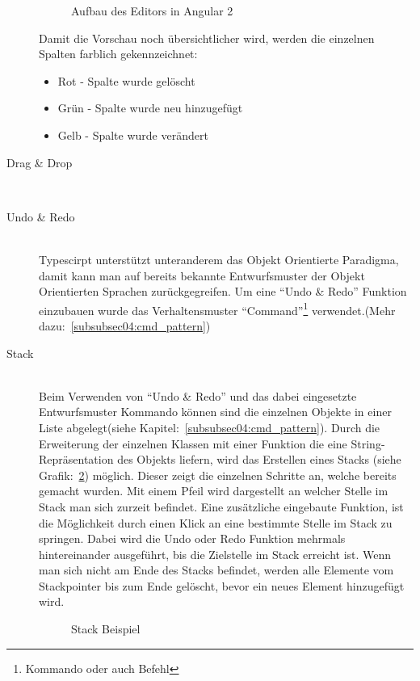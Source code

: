 \begin{description}
\begin{figure}[ht]
        \centering
        \caption{Aufbau des Editors in Angular 2}
        \label{pic:architecture_editor_vorschau}
\end{figure}

Damit die Vorschau noch übersichtlicher wird, werden die einzelnen Spalten farblich gekennzeichnet:
\begin{itemize}
    \item Rot - Spalte wurde gelöscht
    \item Grün - Spalte wurde neu hinzugefügt
    \item Gelb - Spalte wurde verändert
\end{itemize}

\item[Drag \& Drop] \hfill\\

\item[Undo \& Redo] \hfill\\
Typescirpt unterstützt unteranderem das Objekt Orientierte Paradigma, damit kann man auf bereits bekannte Entwurfsmuster der Objekt Orientierten Sprachen zurückgegreifen. 
Um eine ``Undo \& Redo'' Funktion einzubauen wurde das Verhaltensmuster ``Command''\footnote{Kommando oder auch Befehl} verwendet.(Mehr dazu:~\ref{subsubsec04:cmd_pattern})

\item[Stack] \hfill\\
Beim Verwenden von ``Undo \& Redo'' und das dabei eingesetzte Entwurfsmuster Kommando können sind die einzelnen Objekte in einer Liste abgelegt(siehe Kapitel:~\ref{subsubsec04:cmd_pattern}).
Durch die Erweiterung der einzelnen Klassen mit einer Funktion die eine String-Repräsentation des Objekts liefern, wird das Erstellen eines Stacks (siehe Grafik:~\ref{pic:stack}) möglich. Dieser zeigt die einzelnen Schritte an, welche bereits gemacht wurden. Mit einem Pfeil wird dargestellt an welcher Stelle im Stack man sich zurzeit befindet. Eine zusätzliche eingebaute Funktion, ist die Möglichkeit durch einen Klick an eine bestimmte Stelle im Stack zu springen. Dabei wird die Undo oder Redo Funktion mehrmals hintereinander ausgeführt, bis die Zielstelle im Stack erreicht ist. Wenn man sich nicht am Ende des Stacks befindet, werden alle Elemente vom Stackpointer bis zum Ende gelöscht, bevor ein neues Element hinzugefügt wird. 

\begin{figure}[ht]
        \centering
        \caption{Stack Beispiel}
        \label{pic:stack}
\end{figure}
\end{description}


